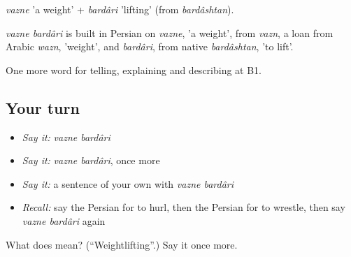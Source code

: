 \emph{vazne} 'a weight' + \emph{bardâri} 'lifting' (from \emph{bardâshtan}).

\begin{cousinweb}
\emph{vazne bardâri} is built in Persian on \emph{vazne}, 'a weight', from \emph{vazn}, a loan from Arabic \emph{wazn}, 'weight', and \emph{bardâri}, from native \emph{bardâshtan}, 'to lift'.
\end{cousinweb}

\begin{grammarlens}[title={What you've built}]
One more word for telling, explaining and describing at B1.
\end{grammarlens}

\subsection*{Your turn}
\begin{itemize}
\raggedright
  \item \emph{Say it:} \emph{vazne bardâri}
  \item \emph{Say it:} \emph{vazne bardâri}, once more
  \item \emph{Say it:} a sentence of your own with \emph{vazne bardâri}
  \item \emph{Recall:} say the Persian for to hurl, then the Persian for to wrestle, then say \emph{vazne bardâri} again
\end{itemize}

\begin{tcolorbox}[breakable,colback=teal!4,colframe=teal!35!black,title={Before you move on}]
What does   mean? (\textquotedblleft{}Weightlifting\textquotedblright{}.) Say it once more.
\end{tcolorbox}
